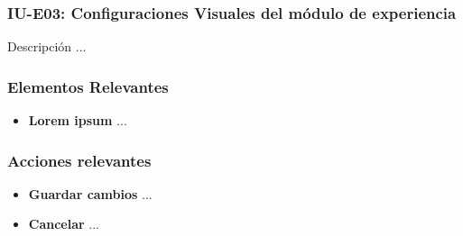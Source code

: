 
\subsubsection{IU-E03: Configuraciones Visuales del módulo de experiencia}

 Descripción ...


\subsubsection{Elementos Relevantes}

    \begin{itemize}
    \item {\bf Lorem ipsum}
        ...
    \end{itemize}

\subsubsection{Acciones relevantes}

    \begin{itemize}
    \item {\bf Guardar cambios}
        ...

    \item {\bf Cancelar}
        ...
    \end{itemize}

\clearpage
